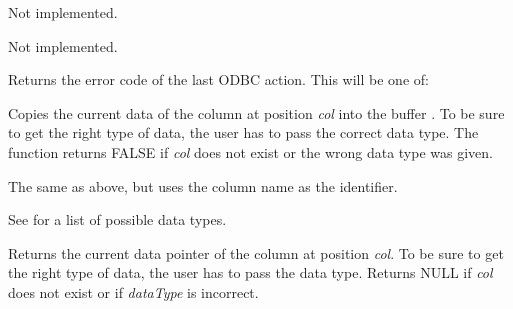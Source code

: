 

Not implemented.



Not implemented.



Returns the error code of the last ODBC action. This will be one of:

\begin{twocollist}\itemsep=0pt
\end{twocollist}

\label{wxrecordsetgetfielddata}


Copies the current data of the column at position {\it col} into the buffer
. To be sure to get the right type of data, the user has to pass the
correct data type. The function returns FALSE if {\it col} does not
exist or the wrong data type was given.


The same as above, but uses the column name as the identifier.

See  for a list
of possible data types.

\label{wxrecordsetgetfielddataptr}


Returns the current data pointer of the column at position {\it col}.
To be sure to get the right type of data, the user has to pass the
data type. Returns NULL if {\it col} does not exist or if {\it dataType} is
incorrect.

